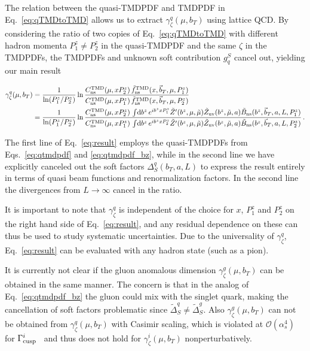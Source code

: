 \documentclass[prd,aps,twocolumn,bibnotes,nofootinbib,preprintnumbers,floatfix]{revtex4-1}
\DeclareRobustCommand{\eq}[1]{Eq.~\eqref{eq:#1}}
\DeclareRobustCommand{\eqs}[2]{Eqs.~\eqref{eq:#1} and \eqref{eq:#2}}
\newcommand{\df}{\mathrm{d}}
\newcommand{\cO}{\mathcal{O}}
\newcommand{\nn}{\nonumber}
\newcommand{\as}{\alpha_s}
\newcommand{\bt}{\vec b_T}
\newcommand{\ns}{{\text{ns}}}
\newcommand\TMD{\mathrm{TMD}}
\begin{document}
The relation between the quasi-TMDPDF and TMDPDF in \eq{qTMDtoTMD} allows us to extract $\gamma_\zeta^q(\mu,b_T)$ using lattice QCD.
By considering the ratio of two copies of \eq{qTMDtoTMD} with different hadron momenta $P^z_1 \ne P^z_2$ in the quasi-TMDPDF and the same $\zeta$ in the TMDPDFs, the TMDPDFs and unknown soft contribution $g^S_q$ cancel out, yielding our main result
\begin{widetext}
\begin{align} \label{eq:result}
 \gamma^q_\zeta(\mu, b_T) &
 = \frac{1}{\ln(P^z_1/P^z_2)}
  \ln \frac{C^\TMD_\ns(\mu,x P_2^z)\, \tilde f^\TMD_\ns(x, \bt, \mu, P^z_1)}
           {C^\TMD_\ns(\mu,x P_1^z)\, \tilde f^\TMD_\ns(x, \bt, \mu, P^z_2)}
 \\
 &= \frac{1}{\ln(P^z_1/P^z_2)}
    \ln \frac{C^\TMD_\ns(\mu,x P_2^z)\, \int\! \df b^z\, e^{ib^z xP_1^z} \tilde Z'(b^z,\mu,\tilde \mu) 
    	   \tilde Z_{\rm uv}(b^z,\tilde \mu, a) \tilde B_{\ns}(b^z, \bt, a, L, P_1^z)}
           {C^\TMD_\ns(\mu,x P_1^z)\, \int\! \df b^z\, e^{ib^z xP_2^z} \tilde Z'(b^z,\mu,\tilde \mu) 
           	\tilde Z_{\rm uv}(b^z,\tilde \mu, a) \tilde B_{\ns}(b^z, \bt, a, L, P_2^z)}
\nn\,.\end{align}
\end{widetext}
The first line of \eq{result} employs the quasi-TMDPDFs from \eqs{qtmdpdf}{qtmdpdf_bz}, while in the second line
we have explicitly canceled out the soft factors $\Delta^q_S(b_T,a,L)$ to express the result entirely in terms of quasi beam functions and renormalization factors. In the second line the divergences from $L\to\infty$ cancel in the ratio.


It is important to note that $\gamma_\zeta^q$ is independent of the choice for $x$, $P_1^z$ and $P_2^z$ on the right hand side of \eq{result}, and any residual dependence on these can thus be used to study systematic uncertainties.
Due to the universality of $\gamma_\zeta^q$, \eq{result} can be evaluated with any hadron state (such as a pion).

It is currently not clear if the gluon anomalous dimension $\gamma^g_\zeta(\mu,b_T)$ can be obtained in the same manner. The concern is that in the analog of \eq{qtmdpdf_bz} the gluon could mix with the singlet quark, making the cancellation of soft factors problematic since $\tilde\Delta_S^q \ne \tilde\Delta_S^g$.
Also $\gamma^g_\zeta(\mu,b_T)$ can not be obtained from  $\gamma^q_\zeta(\mu,b_T)$ with Casimir scaling, which is violated at $\cO(\as^4)$ for $\Gamma_{\rm cusp}^i$~\cite{Boels:2017skl,Moch:2017uml,Grozin:2017css} and thus does not hold for $\gamma^i_\zeta(\mu,b_T)$ nonperturbatively.
\end{document}
